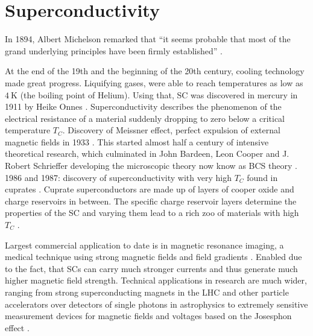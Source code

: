 \documentclass[../notes.tex]{subfiles}
\begin{document}
\chapter{Superconductivity}

In 1894, Albert Michelson remarked that \enquote{it seems probable that most of the grand underlying principles have been firmly established} \cite[p. 159]{chicagoAnnualRegister1896}.


At the end of the 19th and the beginning of the 20th century, cooling technology made great progress.
Liquifying gases, were able to reach temperatures as low as \(\qty{4}{\kelvin}\) (the boiling point of Helium).
Using that, SC was discovered in mercury in 1911 by Heike Onnes \cite{onnesFurtherExperimentsLiquid1991}.
Superconductivity describes the phenomenon of the electrical resistance of a material suddenly dropping to zero below a critical temperature \(T_C\).
Discovery of Meissner effect, perfect expulsion of external magnetic fields in 1933 \cite{meissnerNeuerEffektBei1933}.
This started almost half a century of intensive theoretical research, which culminated in John Bardeen, Leon Cooper and J. Robert Schrieffer developing the microscopic theory now know as BCS theory \cite{bardeenTheorySuperconductivity1957}.
1986 and 1987: discovery of superconductivity with very high \(T_C\) found in cuprates \cite{bednorzPossibleHighTc1986,uchidaHighTcSuperconductivity1987}.
Cuprate superconductors are made up of layers of cooper oxide and charge reservoirs in between.
The specific charge reservoir layers determine the properties of the SC and varying them lead to a rich zoo of materials with high \(T_C\)  \cite{rybickiPerspectivePhaseDiagram2016}.

Largest commercial application to date is in magnetic resonance imaging, a medical technique using strong magnetic fields and field gradients \cite{rinckMagneticResonanceMedicine}.
Enabled due to the fact, that SCs can carry much stronger currents and thus generate much higher magnetic field strength.
Technical applications in research are much wider, ranging from strong superconducting magnets in the LHC \cite{tollestrupDevelopmentSuperconductingMagnets2008} and other particle accelerators over detectors of single photons in astrophysics \cite{irwinTransitionEdgeSensors2005} to extremely sensitive measurement devices for magnetic fields \cite{faleyHighTcSQUIDBiomagnetometers2017} and voltages \cite{klushinPresentFutureHightemperature2020} based on the Josesphon effect \cite{josephsonPossibleNewEffects1962}.
\end{document}
